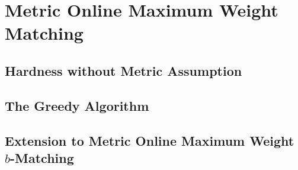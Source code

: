 \section{Metric Online Maximum Weight Matching}

\subsection{Hardness without Metric Assumption}

\subsection{The Greedy Algorithm}

\subsection{Extension to Metric Online Maximum Weight $b$-Matching}